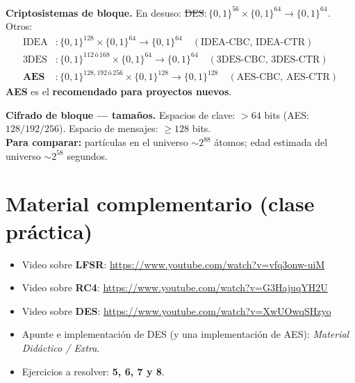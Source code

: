 \documentclass[11pt,a4paper]{article}
\newcommand{\bits}{\{0,1\}}
\begin{document}
\begin{slidebox}
\textbf{Criptosistemas de bloque.} En desuso: \sout{DES}$:\bits^{56}\times\bits^{64}\to\bits^{64}$.
Otros:
\[
\begin{aligned}
  \text{IDEA}&: \bits^{128}\times\bits^{64}\to\bits^{64}\quad(\text{IDEA-CBC, IDEA-CTR})\\
  \text{3DES}&: \bits^{112\,\text{ó}\,168}\times\bits^{64}\to\bits^{64}\quad(\text{3DES-CBC, 3DES-CTR})\\
  \textbf{AES}&: \bits^{128,192\,\text{ó}\,256}\times\bits^{128}\to\bits^{128}
        \quad(\text{AES-CBC, AES-CTR})
\end{aligned}
\]
\textbf{AES} es el \textbf{recomendado para proyectos nuevos}.
\end{slidebox}

\begin{notebox}
\textbf{Cifrado de bloque — tamaños.} Espacios de clave: $>64$ bits (AES: $128/192/256$).
Espacio de mensajes: $\ge 128$ bits.\\
\textbf{Para comparar:} partículas en el universo $\sim 2^{88}$ átomos; edad estimada del
universo $\sim 2^{58}$ segundos.
\end{notebox}

\section*{Material complementario (clase práctica)}
\begin{itemize}[leftmargin=1.4em,itemsep=1pt]
  \item Video sobre \textbf{LFSR}: \url{https://www.youtube.com/watch?v=vfq3onw-uiM}
  \item Video sobre \textbf{RC4}: \url{https://www.youtube.com/watch?v=G3HajuqYH2U}
  \item Video sobre \textbf{DES}: \url{https://www.youtube.com/watch?v=XwUOwqSHzyo}
  \item Apunte e implementación de DES (y una implementación de AES): \emph{Material
        Didáctico / Extra}.
  \item Ejercicios a resolver: \textbf{5, 6, 7 y 8}.
\end{itemize}

\end{document}
